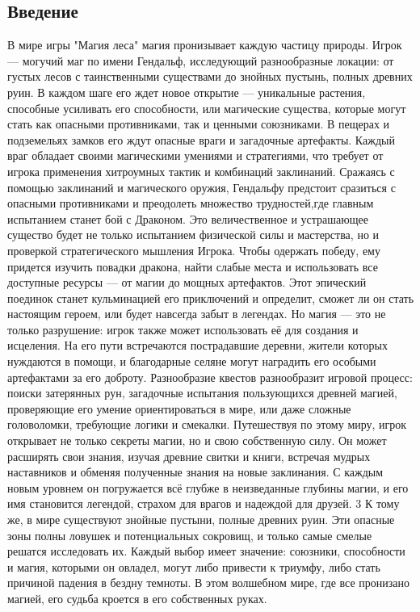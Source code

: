 \documentclass{article}
\begin{document}
\subsection{Введение}
В мире игры "Магия леса" магия пронизывает каждую частицу природы.
Игрок — могучий маг по имени Гендальф, исследующий разнообразные
локации: от густых лесов с таинственными существами до знойных пустынь,
полных древних руин. В каждом шаге его ждет новое открытие — уникальные
растения, способные усиливать его способности, или магические существа,
которые могут стать как опасными противниками, так и ценными союзниками.
В пещерах и подземельях замков его ждут опасные враги и загадочные
артефакты. Каждый враг обладает своими магическими умениями и стратегиями,
что требует от игрока применения хитроумных тактик и комбинаций заклинаний.
Сражаясь с помощью заклинаний и магического оружия, Гендальфу предстоит
сразиться с опасными противниками и преодолеть множество трудностей,где
главным испытанием станет бой с Драконом. Это величественное и устрашающее
существо будет не только испытанием физической силы и мастерства, но
и проверкой стратегического мышления Игрока. Чтобы одержать победу,
ему придется изучить повадки дракона, найти слабые места и использовать
все доступные ресурсы — от магии до мощных артефактов. Этот эпический
поединок станет кульминацией его приключений и определит, сможет ли он
стать настоящим героем, или будет навсегда забыт в легендах.
Но магия — это не только разрушение: игрок также может использовать
её для создания и исцеления. На его пути встречаются пострадавшие деревни,
жители которых нуждаются в помощи, и благодарные селяне могут наградить
его особыми артефактами за его доброту. Разнообразие квестов разнообразит
игровой процесс: поиски затерянных рун, загадочные испытания пользующихся
древней магией, проверяющие его умение ориентироваться в мире, или
даже сложные головоломки, требующие логики и смекалки.
Путешествуя по этому миру, игрок открывает не только секреты магии,
но и свою собственную силу. Он может расширять свои знания, изучая
древние свитки и книги, встречая мудрых наставников и обменяя полученные
знания на новые заклинания. С каждым новым уровнем он погружается
всё глубже в неизведанные глубины магии, и его имя становится легендой,
страхом для врагов и надеждой для друзей.
3
К тому же, в мире существуют знойные пустыни, полные древних руин.
Эти опасные зоны полны ловушек и потенциальных сокровищ, и только
самые смелые решатся исследовать их. Каждый выбор имеет значение:
союзники, способности и магия, которыми он овладел, могут либо привести
к триумфу, либо стать причиной падения в бездну темноты. В этом волшебном
мире, где все пронизано магией, его судьба кроется в его собственных руках.
\end{document}
